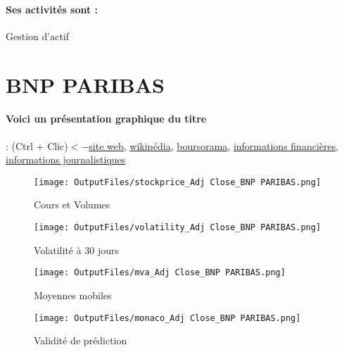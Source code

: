 \documentclass[11pt,a4paper]{report}%
\begin{document}
\paragraph{Ses activités sont : } Gestion d’actif 
    
    \newpage

\section{BNP PARIBAS}

\paragraph{Voici un présentation graphique du titre} : (Ctrl + Clic)$<-$\href{https://invest.bnpparibas.com/}{site web}, \href{https://fr.wikipedia.org/wiki/BNP_Paribas}{wikipédia}, \href{https://www.boursorama.com/cours/1rPBNP}{boursorama}, \href{https://www.qwant.com/?q=site:https:%2f%2fwww.easybourse.com%2faction-societe%2fBNP-PARIBAS&t=web&client=ext-firefox-hp}{informations financières}, \href{https://bourse.lerevenu.com/cours-de-bourse/fiche-valeur-synthese/BNP-PARIBAS/BNP-FR}{informations journalistiques}
\begin{figure}[!htb]
   \begin{minipage}{0.5\textwidth}
     \centering
     \texttt{[image: OutputFiles/stockprice\_Adj Close\_BNP PARIBAS.png]}
     \caption{Cours et Volumes}\label{Fig:price_BNP PARIBAS}
   \end{minipage}\hfill
   \begin{minipage}{0.5\textwidth}
     \centering
     \texttt{[image: OutputFiles/volatility\_Adj Close\_BNP PARIBAS.png]}
     \caption{Volatilité à 30 jours}\label{Fig:volat_BNP PARIBAS}
   \end{minipage}
\end{figure}
\begin{figure}[!htb]
   \begin{minipage}{0.5\textwidth}
     \centering
     \texttt{[image: OutputFiles/mva\_Adj Close\_BNP PARIBAS.png]}
     \caption{Moyennes mobiles}\label{Fig:mva_BNP PARIBAS}
   \end{minipage}\hfill
   \begin{minipage}{0.5\textwidth}
     \centering
     \texttt{[image: OutputFiles/monaco\_Adj Close\_BNP PARIBAS.png]}
     \caption{Validité de prédiction}\label{Fig:prediction_BNP PARIBAS}
   \end{minipage}
\end{figure}
\end{document}
